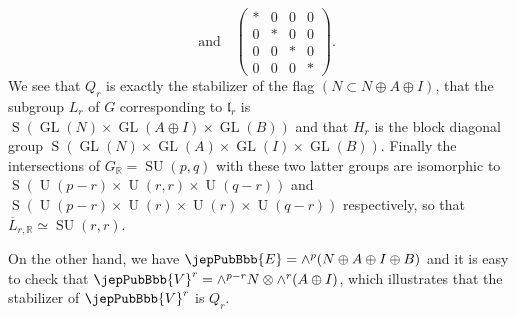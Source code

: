 \begin{example}
\[\quad\text{and}\quad
\begin{pmatrix}*&0&0&0\\0&*&0&0\\0&0&*&0\\0&0&0&*\end{pmatrix}.
\]
We see that $Q_r$ is exactly the stabilizer of the flag $(N\subset N\oplus A\oplus I)$, that the subgroup $L_r$ of $G$ corresponding to $\mathfrak l_r$ is $\operatorname S(\operatorname{GL}(N)\times\operatorname{GL}(A\oplus I)\times\operatorname{GL}(B))$ and that $H_r$ is the block diagonal group $\operatorname S(\operatorname{GL}(N)\times\operatorname{GL}(A)\times\operatorname{GL}(I)\times\operatorname{GL}(B))$. Finally the intersections of $G_{\mathbb R}=\operatorname{SU}(p,q)$ with these two latter groups are isomorphic to $\operatorname S(\operatorname U(p-r)\times\operatorname U(r,r)\times\operatorname U(q-r))$ and $\operatorname S(\operatorname U(p-r)\times\operatorname U(r)\times\operatorname U(r)\times\operatorname U(q-r))$ respectively, so that $\overline L_{r,\mathbb R}\simeq\operatorname{SU}(r,r)$.

On the other hand, we have $\jepPubBbb{E}=\wedge^p(N\oplus A\oplus I\oplus B)$ and it is easy to check that $\jepPubBbb{V}^r=\wedge^{p-r}N\otimes\wedge^r(A\oplus I)$, which illustrates that the stabilizer of $\jepPubBbb{V}^r$ is $Q_r$.
\end{example}
